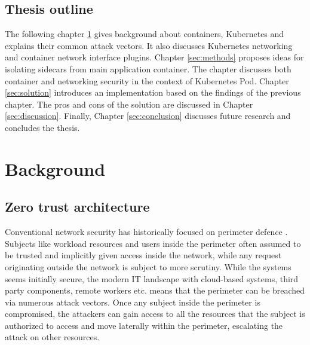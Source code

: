 \documentclass[english, 12pt, a4paper, sci, utf8, a-2b, online]{aaltothesis}
\begin{document}
\subsection{Thesis outline}

The following chapter \ref{sec:bg} gives background about containers, Kubernetes and explains their common attack vectors. It also discusses Kubernetes networking and container network interface plugins. Chapter \ref{sec:methods} proposes ideas for isolating sidecars from main application container. The chapter discusses both container and networking security in the context of Kubernetes Pod. Chapter \ref{sec:solution} introduces an implementation based on the findings of the previous chapter. The pros and cons of the solution are discussed in Chapter \ref{sec:discussion}. Finally, Chapter \ref{sec:conclusion} discusses future research and concludes the thesis.

\clearpage

\section{Background} \label{sec:bg}

\subsection{Zero trust architecture}


Conventional network security has historically focused on perimeter defence \cite{kerman2020implementing}. Subjects like workload resources and users inside the perimeter often assumed to be trusted and implicitly given access inside the network, while any request originating outside the network is subject to more scrutiny. While the systems seems initially secure, the modern IT landscape with cloud-based systems, third party components, remote workers etc. means that the perimeter can be breached via numerous attack vectors. Once any subject inside the perimeter is compromised, the attackers can gain access to all the resources that the subject is authorized to access and move laterally within the perimeter, escalating the attack on other resources.
\end{document}
